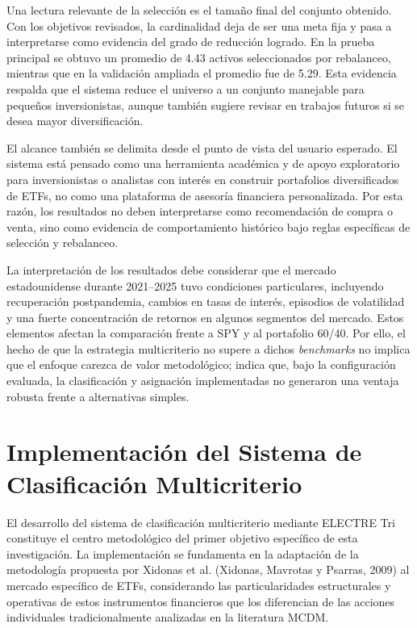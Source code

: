 \documentclass[12pt,letterpaper]{article}
\begin{document}
Una lectura relevante de la selección es el tamaño final del conjunto obtenido. Con los objetivos revisados, la cardinalidad deja de ser una meta fija y pasa a interpretarse como evidencia del grado de reducción logrado. En la prueba principal se obtuvo un promedio de 4.43 activos seleccionados por rebalanceo, mientras que en la validación ampliada el promedio fue de 5.29. Esta evidencia respalda que el sistema reduce el universo a un conjunto manejable para pequeños inversionistas, aunque también sugiere revisar en trabajos futuros si se desea mayor diversificación.



El alcance también se delimita desde el punto de vista del usuario esperado. El sistema está pensado como una herramienta académica y de apoyo exploratorio para inversionistas o analistas con interés en construir portafolios diversificados de ETFs, no como una plataforma de asesoría financiera personalizada. Por esta razón, los resultados no deben interpretarse como recomendación de compra o venta, sino como evidencia de comportamiento histórico bajo reglas específicas de selección y rebalanceo.

La interpretación de los resultados debe considerar que el mercado estadounidense durante 2021--2025 tuvo condiciones particulares, incluyendo recuperación postpandemia, cambios en tasas de interés, episodios de volatilidad y una fuerte concentración de retornos en algunos segmentos del mercado. Estos elementos afectan la comparación frente a SPY y al portafolio 60/40. Por ello, el hecho de que la estrategia multicriterio no supere a dichos \textit{benchmarks} no implica que el enfoque carezca de valor metodológico; indica que, bajo la configuración evaluada, la clasificación y asignación implementadas no generaron una ventaja robusta frente a alternativas simples.

\clearpage
\section{Implementación del Sistema de Clasificación Multicriterio}

El desarrollo del sistema de clasificación multicriterio mediante ELECTRE Tri constituye el centro metodológico del primer objetivo específico de esta investigación. La implementación se fundamenta en la adaptación de la metodología propuesta por Xidonas et al. (Xidonas, Mavrotas y Psarras, 2009) al mercado específico de ETFs, considerando las particularidades estructurales y operativas de estos instrumentos financieros que los diferencian de las acciones individuales tradicionalmente analizadas en la literatura MCDM.
\end{document}

